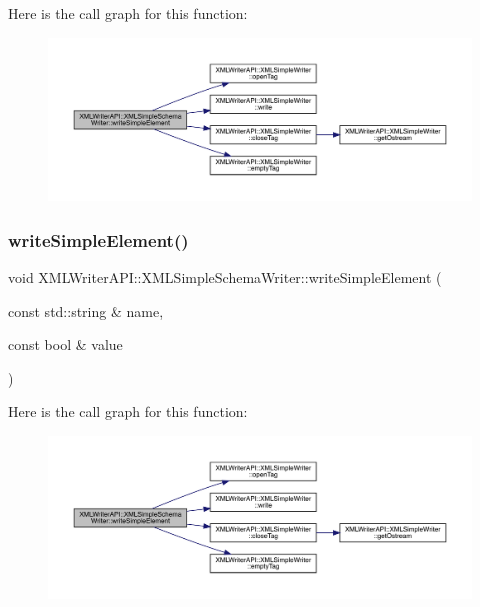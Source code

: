 Here is the call graph for this function\+:
\nopagebreak
\begin{figure}[H]
\begin{center}
\leavevmode
\includegraphics[width=350pt]{db/d0b/classXMLWriterAPI_1_1XMLSimpleSchemaWriter_aecd8faa2f1b2411dc108007c05bdb339_cgraph}
\end{center}
\end{figure}
\mbox{\label{classXMLWriterAPI_1_1XMLSimpleSchemaWriter_aecd8faa2f1b2411dc108007c05bdb339}} 
\subsubsection{\texorpdfstring{writeSimpleElement()}{writeSimpleElement()}\hspace{0.1cm}{\footnotesize\ttfamily [30/30]}}
{\footnotesize\ttfamily void X\+M\+L\+Writer\+A\+P\+I\+::\+X\+M\+L\+Simple\+Schema\+Writer\+::write\+Simple\+Element (\begin{DoxyParamCaption}\item[{const std\+::string \&}]{name,  }\item[{const bool \&}]{value }\end{DoxyParamCaption})\hspace{0.3cm}{\ttfamily [inline]}}

Here is the call graph for this function\+:
\nopagebreak
\begin{figure}[H]
\begin{center}
\leavevmode
\includegraphics[width=350pt]{db/d0b/classXMLWriterAPI_1_1XMLSimpleSchemaWriter_aecd8faa2f1b2411dc108007c05bdb339_cgraph}
\end{center}
\end{figure}


